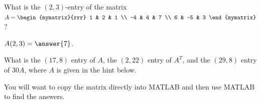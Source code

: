 \documentclass{ximera}
\begin{document}
\begin{problem}
  What is the $(2,3)$-entry of the matrix $A=\begin{mymatrix}{rrr}
    1 & 2 & 1 \\
    -4 & 4 & 7 \\
    6 & -5 & 3
  \end{mymatrix}$?
  \begin{sol}
    $A(2,3)=\answer{7}$.
  \end{sol}

  What is the $(17,8)$ entry of $A$, the $(2,22)$ entry of $A^T$, and the $(29,8)$ entry of $30A$, where $A$ is given in the hint below. 
  
  You will want to copy the matrix directly into MATLAB and then use MATLAB to find the answers.

  \begin{hint}


\end{hint}
\end{problem}
\end{document}
